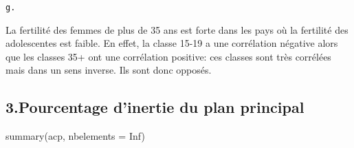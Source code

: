 \documentclass[
]{article}
\newenvironment{Shaded}{\begin{snugshade}}{\end{snugshade}}
\newcommand{\AttributeTok}[1]{\textcolor[rgb]{0.77,0.63,0.00}{#1}}
\newcommand{\ConstantTok}[1]{\textcolor[rgb]{0.00,0.00,0.00}{#1}}
\newcommand{\FunctionTok}[1]{\textcolor[rgb]{0.00,0.00,0.00}{#1}}
\newcommand{\NormalTok}[1]{#1}
\begin{document}
\begin{verbatim}
g.
\end{verbatim}

La fertilité des femmes de plus de 35 ans est forte dans les pays où la
fertilité des adolescentes est faible. En effet, la classe 15-19 a une
corrélation négative alors que les classes 35+ ont une corrélation
positive: ces classes sont très corrélées mais dans un sens inverse. Ils
sont donc opposés.

\hypertarget{pourcentage-dinertie-du-plan-principal}{%
\subsection{3.Pourcentage d'inertie du plan
principal}\label{pourcentage-dinertie-du-plan-principal}}

\begin{Shaded}
\begin{Highlighting}[]
\FunctionTok{summary}\NormalTok{(acp, }\AttributeTok{nbelements =} \ConstantTok{Inf}\NormalTok{)}
\end{Highlighting}
\end{Shaded}
\end{document}
